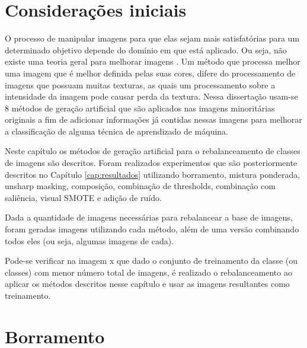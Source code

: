 \section{Considerações iniciais}
O processo de manipular imagens para que elas sejam mais satisfatórias para um
determinado objetivo depende do domínio em que está aplicado. Ou seja, não
existe uma teoria geral para melhorar imagens \cite{gonzalez}. Um método que processa melhor
uma imagem que é melhor definida pelas suas cores, difere do processamento de
imagens que possuam muitas texturas, as quais um processamento sobre a intensidade
da imagem pode causar perda da textura. Nessa dissertação usam-se 8 métodos
de geração artificial que são aplicados nas imagens minoritárias originais a fim
de adicionar informações já contidas nessas imagens para melhorar a classificação
de alguma técnica de aprendizado de máquina.

Neste capítulo os métodos de geração artificial para o rebalanceamento de classes
de imagens são descritos. Foram realizados experimentos que são posteriormente descritos no Capítulo
\ref{cap:resultados} utilizando borramento, mistura ponderada, unsharp masking,
composição, combinação de thresholds, combinação com saliência, visual SMOTE e adição de ruído.

Dada a quantidade de imagens necessárias para rebalancear a base de imagens, foram geradas imagens utilizando
cada método, além de uma versão combinando todos eles (ou seja, algumas imagens de cada).

Pode-se verificar na imagem x que dado o conjunto de treinamento da classe (ou classes)
com menor número total de imagens, é realizado o rebalanceamento ao aplicar os
métodos descritos nesse capítulo e usar as imagens resultantes como treinamento.



\section{Borramento}

